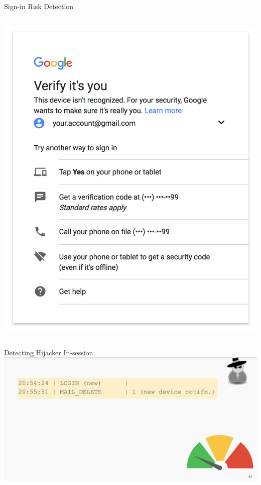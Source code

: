 \documentclass[nobackground,dvipsnames,table,aspectratio=169]{beamer}
\begin{document}
\begin{frame}{Sign-in Risk Detection}
\begin{columns}
            \includegraphics[width=\textwidth]{google-2fa}
    \end{columns}
\end{frame}

\begin{frame}{Detecting Hijacker In-session}
    \includegraphics[width=\textwidth]{detecting-hijackers-1}
\end{frame}
\end{document}
